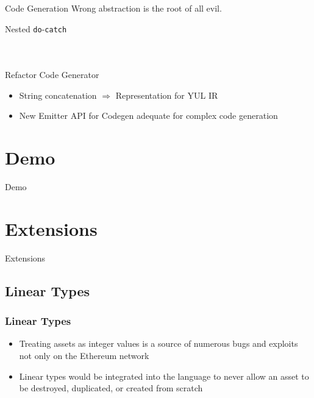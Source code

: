 \documentclass[aspectratio=169]{beamer}
\newcommand{\sectionslide}[1]{%
  \section{#1}
  \begin{frame}
  \begin{center}
    \vbox{}
    {\LARGE \usebeamercolor[fg]{title} #1}
    \par
  \end{center}
  \end{frame}
}
\begin{document}
\begin{frame}{Code Generation}
\centering
Wrong abstraction is the root of all evil.
\end{frame}

\begin{frame}{Nested \texttt{do}-\texttt{catch}}
\begin{columns}
    \begin{column}{0.5\textwidth}
        \inputminted[fontsize=\small]{swift}{code/nested-do.flint}
    \end{column}
    \begin{column}{0.5\textwidth}
        \inputminted[fontsize=\small]{swift}{code/nested-do-catch.flint}
    \end{column}
\end{columns}
\end{frame}

\begin{frame}{Refactor Code Generator}
\begin{itemize}
    \item String concatenation $\Rightarrow$ Representation for YUL IR
    \item New Emitter API for Codegen adequate for complex code generation
\end{itemize}
\end{frame}

\sectionslide{Demo}

\sectionslide{Extensions}
\subsection{Linear Types}

\begin{frame}
\frametitle{Linear Types}
\begin{itemize}
    \item Treating assets as integer values is a source of numerous bugs and exploits not only on the Ethereum network
    \item Linear types would be integrated into the language to never allow an asset to be destroyed, duplicated, or created from scratch
\end{itemize}
\end{frame}
\end{document}
